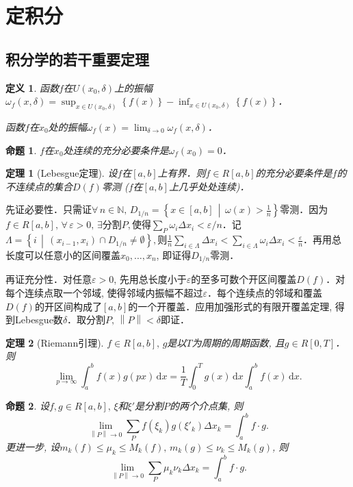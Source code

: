 \documentclass[11pt,a4paper]{ctexart}
\makeatletter
\theoremstyle{thmseries} %
\newtheorem{thm}{定理}[section]
\newtheorem{prop}{命题}[section]
\theoremstyle{exerseries}
\newtheorem{defn}{定义}[section]
\renewenvironment{proof}[1][\proofname]{\par
  \pushQED{\qed}%
  \normalfont \topsep6\p@\@plus6\p@\relax
  \trivlist
  \item[\hskip\labelsep
        \itshape
    #1\@addpunct{}]\ignorespaces
}{%
  \popQED\endtrivlist\@endpefalse
}
\newenvironment{pf}{\begin{proof}[\bfseries\upshape 证\quad]}{\end{proof}}
\newcommand{\cbra}[1]{\mathopen{}\left\{#1\right\}}
\renewcommand{\epsilon}{\varepsilon}
\newcommand{\N}{\mathbb{N}}
\renewcommand{\d}{\mathrm{d}}
\newcommand{\norm}[1]{\left\lVert#1\right\rVert}
\makeatother
\begin{document}
\section{定积分}
\subsection{积分学的若干重要定理}
\begin{defn}
	函数$f$在$U(x_0,\delta)$上的振幅$\omega_f(x,\delta)=\sup_{x\in U(x_0,\delta)}\cbra{f(x)}-\inf_{x\in U(x_0,\delta)}\cbra{f(x)}$．
	
	函数$f$在$x_0$处的振幅$\omega_f(x)=\lim_{\delta\to 0}\omega_f(x,\delta)$．
\end{defn}

\begin{prop}
	$f$在$x_0$处连续的充分必要条件是$\omega_f(x_0)=0$．
\end{prop}

\begin{thm}[Lebesgue定理]
	设$f$在$[a,b]$上有界．则$f\in R[a,b]$的充分必要条件是$f$的不连续点的集合$D(f)$零测 ($f$在$[a,b]$上几乎处处连续)．
\end{thm}
\begin{pf}
	\everymath{\textstyle}
	先证必要性．只需证$\forall\,n\in\N,\,D_{1/n}=\cbra{x\in[a,b]\,\middle\vert\,\omega(x)>\frac{1}{n}}$零测．因为$f\in R[a,b],\,\forall\,\epsilon>0,\,\exists$分割$P,$使得$\sum_P\omega_i\Delta x_i<\epsilon/n$．记$\Lambda=\cbra{i\,\middle\vert\,(x_{i-1},x_i)\cap D_{1/n}\neq\emptyset},$则$\frac{1}{n}\sum_{i\in\Lambda}\Delta x_i<\sum_{i\in\Lambda}\omega_i\Delta x_i<\frac{\epsilon}{n}$．再用总长度可以任意小的区间覆盖$x_0,\dots,x_n$, 即证得$D_{1/n}$零测．

	再证充分性．对任意$\epsilon>0$, 先用总长度小于$\epsilon$的至多可数个开区间覆盖$D(f)$．对每个连续点取一个邻域, 使得邻域内振幅不超过$\epsilon$．每个连续点的邻域和覆盖$D(f)$的开区间构成了$[a,b]$的一个开覆盖．应用加强形式的有限开覆盖定理, 得到Lebesgue数$\delta$．取分割$P,\,\norm{P}<\delta$即证．
\end{pf}

\begin{thm}[Riemann引理]
	$f\in R[a,b],\,g$是以$T$为周期的周期函数, 且$g\in R[0,T]$．则
	\[\lim_{p\to\infty}\int_{a}^{b}f(x)g(px)\,\d x=\frac{1}{T}\int_{0}^{T}g(x)\,\d x\int_{a}^{b}f(x)\,\d x.\]
\end{thm}

\begin{prop}
	设$f,g\in R[a,b],\,\xi$和$\xi'$是分割$P$的两个介点集, 则
	\[\lim_{\norm{P}\to0}\sum_P f(\xi_k)g(\xi'_k)\Delta x_k=\int_{a}^{b}f\cdot g.\]
	更进一步, 设$m_k(f)\leq\mu_k\leq M_k(f),\,m_k(g)\leq\nu_k\leq M_k(g)$, 则
	\[\lim_{\norm{P}\to0}\sum_P \mu_k\nu_k\Delta x_k=\int_{a}^{b}f\cdot g.\]
\end{prop}
\end{document}
